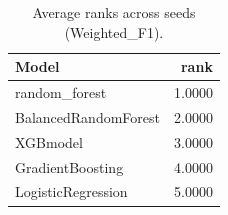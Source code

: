 \begin{table}[t]
\centering
\begin{tabular}{lr}
\toprule
Model & rank \\
\midrule
random_forest & 1.0000 \\
BalancedRandomForest & 2.0000 \\
XGBmodel & 3.0000 \\
GradientBoosting & 4.0000 \\
LogisticRegression & 5.0000 \\
\bottomrule
\end{tabular}
\caption{Average ranks across seeds (Weighted_F1).}
\label{tab:avg_rank_Weighted_F1}
\end{table}